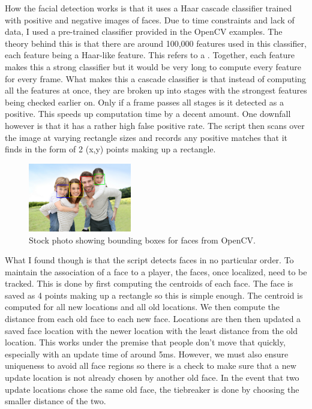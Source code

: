 \documentclass[a4paper,10pt]{article}
\begin{document}
How the facial detection works is that it uses a Haar cascade classifier trained with positive and negative images of faces. Due to time constraints and lack of data, I used a pre-trained classifier provided in the OpenCV examples. The theory behind this is that there are around 100,000 features used in this classifier, each feature being a Haar-like feature. This refers to a . Together, each feature makes this a strong classifier but it would be very long to compute every feature for every frame. What makes this a cascade classifier is that instead of computing all the features at once, they are broken up into stages with the strongest features being checked earlier on. Only if a frame passes all stages is it detected as a positive. This speeds up computation time by a decent amount. One downfall however is that it has a rather high false positive rate. The script then scans over the image at varying rectangle sizes and records any positive matches that it finds in the form of 2 (x,y) points making up a rectangle.
\begin{figure}[H]
  \centering
      \includegraphics[width=0.4\textwidth]{Assets/FacialRecognition.png}
  \caption{Stock photo showing bounding boxes for faces from OpenCV.}
\end{figure}


What I found though is that the script detects faces in no particular order. To maintain the association of a face to a player, the faces, once localized, need to be tracked. This is done by first computing the centroids of each face. The face is saved as 4 points making up a rectangle so this is simple enough. The centroid is computed for all new locations and all old locations. We then compute the distance from each old face to each new face. Locations are then then updated a saved face location with the newer location with the least distance from the old location. This works under the premise that people don't move that quickly, especially with an update time of around 5ms. However, we must also ensure uniqueness to avoid all face regions so there is a check to make sure that a new update location is not already chosen by another old face. In the event that two update locations chose the same old face, the tiebreaker is done by choosing the smaller distance of the two.
\end{document}
